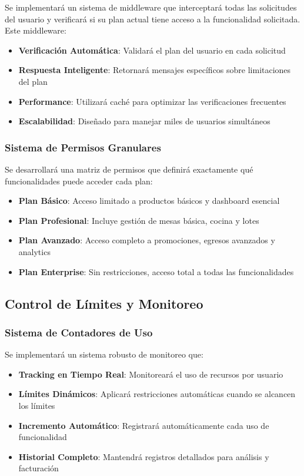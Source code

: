 \documentclass[12pt,a4paper]{article}
\begin{document}
Se implementará un sistema de middleware que interceptará todas las solicitudes del usuario y verificará si su plan actual tiene acceso a la funcionalidad solicitada. Este middleware:

\begin{itemize}
    \item \textbf{Verificación Automática}: Validará el plan del usuario en cada solicitud
    \item \textbf{Respuesta Inteligente}: Retornará mensajes específicos sobre limitaciones del plan
    \item \textbf{Performance}: Utilizará caché para optimizar las verificaciones frecuentes
    \item \textbf{Escalabilidad}: Diseñado para manejar miles de usuarios simultáneos
\end{itemize}

\subsubsection{Sistema de Permisos Granulares}

Se desarrollará una matriz de permisos que definirá exactamente qué funcionalidades puede acceder cada plan:

\begin{itemize}
    \item \textbf{Plan Básico}: Acceso limitado a productos básicos y dashboard esencial
    \item \textbf{Plan Profesional}: Incluye gestión de mesas básica, cocina y lotes
    \item \textbf{Plan Avanzado}: Acceso completo a promociones, egresos avanzados y analytics
    \item \textbf{Plan Enterprise}: Sin restricciones, acceso total a todas las funcionalidades
\end{itemize}

\subsection{Control de Límites y Monitoreo}

\subsubsection{Sistema de Contadores de Uso}

Se implementará un sistema robusto de monitoreo que:

\begin{itemize}
    \item \textbf{Tracking en Tiempo Real}: Monitoreará el uso de recursos por usuario
    \item \textbf{Límites Dinámicos}: Aplicará restricciones automáticas cuando se alcancen los límites
    \item \textbf{Incremento Automático}: Registrará automáticamente cada uso de funcionalidad
    \item \textbf{Historial Completo}: Mantendrá registros detallados para análisis y facturación
\end{itemize}
\end{document}
